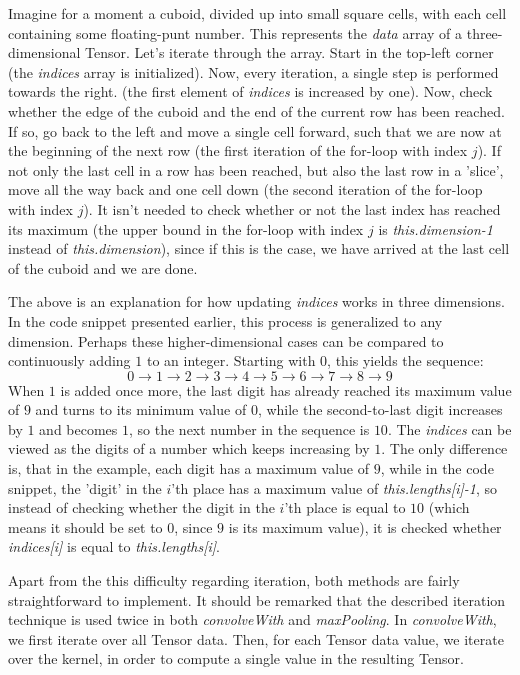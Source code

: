 \documentclass[12pt, titlepage]{article}
\begin{document}
		Imagine for a moment a cuboid, divided up into small square cells, with each cell containing some floating-punt number. This represents the \textit{data} array of a three-dimensional Tensor. Let's iterate through the array. Start in the top-left corner (the \textit{indices} array is initialized). Now, every iteration, a single step is performed towards the right. (the first element of \textit{indices} is increased by one). Now, check whether the edge of the cuboid and the end of the current row has been reached. If so, go back to the left and move a single cell forward, such that we are now at the beginning of the next row (the first iteration of the for-loop with index $j$). If not only the last cell in a row has been reached, but also the last row in a 'slice', move all the way back and one cell down (the second iteration of the for-loop with index $j$). It isn’t needed to check whether or not the last index has reached its maximum (the upper bound in the for-loop with index $j$ is \textit{this.dimension-1} instead of \textit{this.dimension}), since if this is the case, we have arrived at the last cell of the cuboid and we are done.
		
		The above is an explanation for how updating \textit{indices} works in three dimensions. In the code snippet presented earlier, this process is generalized to any dimension. Perhaps these higher-dimensional cases can be compared to continuously adding $1$ to an integer. Starting with $0$, this yields the sequence:
		\begin{equation*}
		0\to1\to 2\to 3\to 4\to 5\to 6\to 7\to 8\to 9
		\end{equation*}
		When $1$ is added once more, the last digit has already reached its maximum value of $9$ and turns to its minimum value of $0$, while the second-to-last digit increases by $1$ and becomes $1$, so the next number in the sequence is $10$. The \textit{indices} can be viewed as the digits of a number which keeps increasing by $1$. The only difference is, that in the example, each digit has a maximum value of $9$, while in the code snippet, the 'digit' in the $i$'th place has a maximum value of \textit{this.lengths[i]-1}, so instead of checking whether the digit in the $i$'th place is equal to $10$ (which means it should be set to $0$, since $9$ is its maximum value), it is checked whether \textit{indices[i]} is equal to \textit{this.lengths[i]}.
		
		Apart from the this difficulty regarding iteration, both methods are fairly straightforward to implement. It should be remarked that the described iteration technique is used twice in both \textit{convolveWith} and \textit{maxPooling}. In \textit{convolveWith}, we first iterate over all Tensor data. Then, for each Tensor data value, we iterate over the kernel, in order to compute a single value in the resulting Tensor.
		
\end{document}
